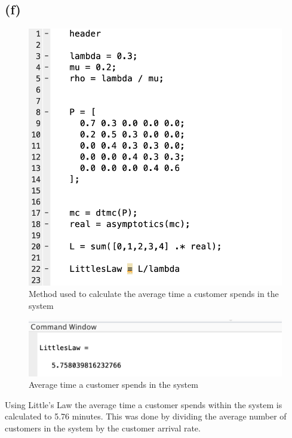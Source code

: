 \documentclass{article}
\begin{document}
\subsection{(f)}
\begin{figure}[H]
    \includegraphics[width=\linewidth]{./imgs/5fcode.png}
    \caption{Method used to calculate the average time a customer spends in the system}
\end{figure}
\begin{figure}[H]
    \includegraphics[width=\linewidth]{./imgs/5fans.png}
    \caption{Average time a customer spends in the system}
\end{figure}
Using Little's Law the average time a customer spends within the system is calculated to 5.76 minutes. 
This was done by dividing the average number of customers in the system by the customer arrival rate.
\end{document}
